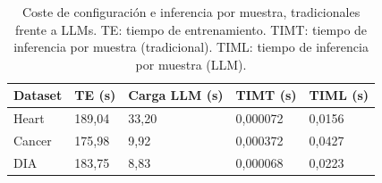\begin{table}[htbp]
\centering
\caption[Coste de configuración e inferencia por muestra, tradicionales frente a LLMs]{Coste de configuración e inferencia por muestra, tradicionales frente a LLMs. TE: tiempo de entrenamiento. TIMT: tiempo de inferencia por muestra (tradicional). TIML: tiempo de inferencia por muestra (LLM).}
\label{tab:comparativa_tiempos}
\begin{tabular}{lllll}
\toprule
Dataset & TE (s) & Carga LLM (s) & TIMT (s) & TIML (s) \\
\midrule
Heart & 189{,}04 & 33{,}20 & 0{,}000072 & 0{,}0156 \\
Cancer & 175{,}98 & 9{,}92 & 0{,}000372 & 0{,}0427 \\
DIA & 183{,}75 & 8{,}83 & 0{,}000068 & 0{,}0223 \\
\bottomrule
\end{tabular}
\end{table}
